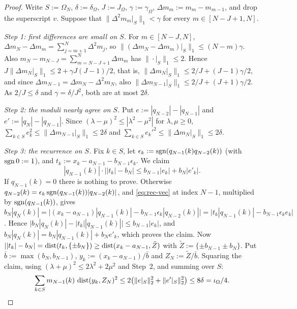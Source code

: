 \begin{proof}
Write $S:=\Omega_N$, $\delta:=\delta_\Omega$, $J:=J_\Omega$, $\gamma:=\gamma_\Omega$, $\Delta m_m:=m_m-m_{m-1}$, and drop the superscript $v$.
Suppose that $\|\Delta^2m_m|_S\|_1<\gamma$ for every $m\in[N-J+1,N]$.

\emph{Step 1: first differences are small on $S$.} For $m\in[N-J,N]$, $\Delta m_N-\Delta m_m=\sum_{j=m+1}^N\Delta^2m_j$, so
$\|(\Delta m_N-\Delta m_m)|_S\|_1\le(N-m)\gamma$. Also $m_N-m_{N-J}=\sum_{m=N-J+1}^N\Delta m_m$ has $\|\cdot|_S\|_1\le2$. Hence
$J\|\Delta m_N|_S\|_1\le2+\gamma J(J-1)/2$, that is, $\|\Delta m_N|_S\|_1\le2/J+(J-1)\gamma/2$, and since
$\Delta m_{N-1}=\Delta m_N-\Delta^2m_N$, also $\|\Delta m_{N-1}|_S\|_1\le2/J+(J+1)\gamma/2$. As $2/J\le\delta$ and $\gamma=\delta/J^2$, both
are at most $2\delta$.

\emph{Step 2: the moduli nearly agree on $S$.} Put $e:=|q_{N-2}|-|q_{N-1}|$ and $e':=|q_N|-|q_{N-1}|$. Since
$(\lambda-\mu)^2\le|\lambda^2-\mu^2|$ for $\lambda,\mu\ge0$, $\sum_{k\in S}e_k^2\le\|\Delta m_{N-1}|_S\|_1\le2\delta$ and
$\sum_{k\in S}e_k'^2\le\|\Delta m_N|_S\|_1\le2\delta$.

\emph{Step 3: the recurrence on $S$.} Fix $k\in S$, let $\epsilon_k:=\operatorname{sgn}(q_{N-1}(k)q_{N-2}(k))$ (with $\operatorname{sgn}0:=1$),
and $t_k:=x_k-a_{N-1}-b_{N-1}\epsilon_k$. We claim
\[
  |q_{N-1}(k)|\cdot\bigl||t_k|-b_N\bigr|\le b_{N-1}|e_k|+b_N|e'_k| .
\]
If $q_{N-1}(k)=0$ there is nothing to prove. Otherwise $q_{N-2}(k)=\epsilon_k\operatorname{sgn}(q_{N-1}(k))|q_{N-2}(k)|$, and
\eqref{eq:rec-vec} at index $N-1$, multiplied by $\operatorname{sgn}(q_{N-1}(k))$, gives
$b_N|q_N(k)|=\bigl|(x_k-a_{N-1})|q_{N-1}(k)|-b_{N-1}\epsilon_k|q_{N-2}(k)|\bigr|=\bigl|t_k|q_{N-1}(k)|-b_{N-1}\epsilon_ke_k\bigr|$.
Hence $\bigl|b_N|q_N(k)|-|t_k||q_{N-1}(k)|\bigr|\le b_{N-1}|e_k|$, and $b_N|q_N(k)|=b_N|q_{N-1}(k)|+b_Ne'_k$, which
proves the claim. Now $||t_k|-b_N|=\operatorname{dist}(t_k,\{\pm b_N\})\ge\operatorname{dist}(x_k-a_{N-1},\tilde Z)$ with
$\tilde Z:=\{\pm b_{N-1}\pm b_N\}$. Put $\bar b:=\max(b_N,b_{N-1})$, $y_k:=(x_k-a_{N-1})/\bar b$ and $Z_N:=\tilde
Z/\bar b$. Squaring the claim, using $(\lambda+\mu)^2\le2\lambda^2+2\mu^2$ and Step~2, and summing over $S$:
\begin{equation}\label{eq:concentration}
  \sum_{k\in S}m_{N-1}(k)\,\operatorname{dist}(y_k,Z_N)^2\le2\bigl(\|e|_S\|_2^2+\|e'|_S\|_2^2\bigr)\le8\delta=\iota_\Omega/4 .
\end{equation}


\end{proof}
